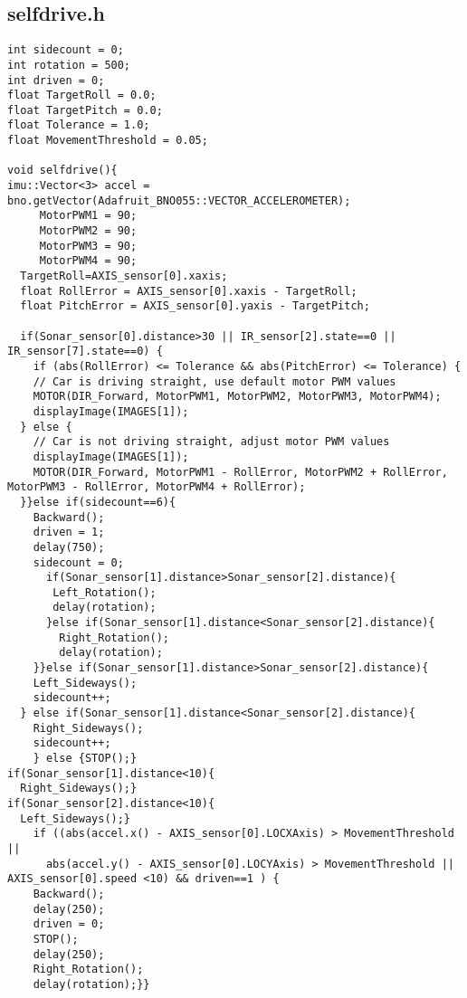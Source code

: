 \subsection{selfdrive.h}
\begin{lstlisting}
int sidecount = 0;
int rotation = 500;
int driven = 0;
float TargetRoll = 0.0;    
float TargetPitch = 0.0;   
float Tolerance = 1.0;
float MovementThreshold = 0.05;   

void selfdrive(){
imu::Vector<3> accel = bno.getVector(Adafruit_BNO055::VECTOR_ACCELEROMETER);
     MotorPWM1 = 90;
     MotorPWM2 = 90;
     MotorPWM3 = 90;
     MotorPWM4 = 90;
  TargetRoll=AXIS_sensor[0].xaxis;
  float RollError = AXIS_sensor[0].xaxis - TargetRoll;
  float PitchError = AXIS_sensor[0].yaxis - TargetPitch;

  if(Sonar_sensor[0].distance>30 || IR_sensor[2].state==0 || IR_sensor[7].state==0) {
    if (abs(RollError) <= Tolerance && abs(PitchError) <= Tolerance) {
    // Car is driving straight, use default motor PWM values
    MOTOR(DIR_Forward, MotorPWM1, MotorPWM2, MotorPWM3, MotorPWM4);
    displayImage(IMAGES[1]);
  } else {
    // Car is not driving straight, adjust motor PWM values
    displayImage(IMAGES[1]);
    MOTOR(DIR_Forward, MotorPWM1 - RollError, MotorPWM2 + RollError, MotorPWM3 - RollError, MotorPWM4 + RollError);
  }}else if(sidecount==6){
    Backward(); 
    driven = 1;
    delay(750); 
    sidecount = 0;
      if(Sonar_sensor[1].distance>Sonar_sensor[2].distance){
       Left_Rotation();
       delay(rotation);
      }else if(Sonar_sensor[1].distance<Sonar_sensor[2].distance){
        Right_Rotation();
        delay(rotation);
    }}else if(Sonar_sensor[1].distance>Sonar_sensor[2].distance){
    Left_Sideways();
    sidecount++;
  } else if(Sonar_sensor[1].distance<Sonar_sensor[2].distance){
    Right_Sideways();
    sidecount++;
    } else {STOP();}
if(Sonar_sensor[1].distance<10){
  Right_Sideways();}
if(Sonar_sensor[2].distance<10){
  Left_Sideways();}
    if ((abs(accel.x() - AXIS_sensor[0].LOCXAxis) > MovementThreshold || 
      abs(accel.y() - AXIS_sensor[0].LOCYAxis) > MovementThreshold || AXIS_sensor[0].speed <10) && driven==1 ) {
    Backward(); 
    delay(250);
    driven = 0;
    STOP();
    delay(250);
    Right_Rotation();
    delay(rotation);}}
\end{lstlisting}